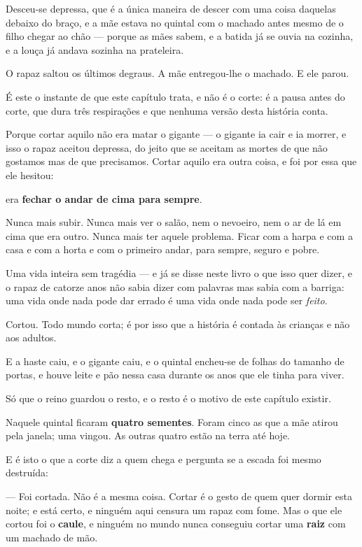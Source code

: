 \documentclass[livro.tex]{subfiles}
\begin{document}
Desceu-se depressa, que é a única maneira de descer com uma coisa daquelas debaixo do
braço, e a mãe estava no quintal com o machado antes mesmo de o filho chegar ao chão ---
porque as mães sabem, e a batida já se ouvia na cozinha, e a louça já andava sozinha na
prateleira.

O rapaz saltou os últimos degraus. A mãe entregou-lhe o machado. E ele parou.

\medskip

É este o instante de que este capítulo trata, e não é o corte: é a pausa antes do corte,
que dura três respirações e que nenhuma versão desta história conta.

Porque cortar aquilo não era matar o gigante --- o gigante ia cair e ia morrer, e isso o
rapaz aceitou depressa, do jeito que se aceitam as mortes de que não gostamos mas de que
precisamos. Cortar aquilo era outra coisa, e foi por essa que ele hesitou:

era \textbf{fechar o andar de cima para sempre}.

Nunca mais subir. Nunca mais ver o salão, nem o nevoeiro, nem o ar de lá em cima que era
outro. Nunca mais ter aquele problema. Ficar com a harpa e com a casa e com a horta e com
o primeiro andar, para sempre, seguro e pobre.

Uma vida inteira sem tragédia --- e já se disse neste livro o que isso quer dizer, e o
rapaz de catorze anos não sabia dizer com palavras mas sabia com a barriga: uma vida onde
nada pode dar errado é uma vida onde nada pode ser \emph{feito}.

\medskip

Cortou. Todo mundo corta; é por isso que a história é contada às crianças e não aos
adultos.

E a haste caiu, e o gigante caiu, e o quintal encheu-se de folhas do tamanho de portas, e
houve leite e pão nessa casa durante os anos que ele tinha para viver.

\medskip

Só que o reino guardou o resto, e o resto é o motivo de este capítulo existir.

Naquele quintal ficaram \textbf{quatro sementes}. Foram cinco as que a mãe atirou pela
janela; uma vingou. As outras quatro estão na terra até hoje.

E é isto o que a corte diz a quem chega e pergunta se a escada foi mesmo destruída:

--- Foi cortada. Não é a mesma coisa. Cortar é o gesto de quem quer dormir esta noite; e
está certo, e ninguém aqui censura um rapaz com fome. Mas o que ele cortou foi o
\textbf{caule}, e ninguém no mundo nunca conseguiu cortar uma \textbf{raiz} com um machado
de mão.
\end{document}
